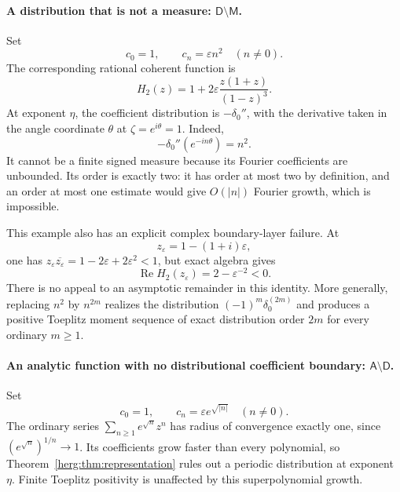 \documentclass[11pt,letterpaper]{article}
\theoremstyle{definition}
\newcommand{\Rea}{\operatorname{Re}}
\newcommand{\eps}{\varepsilon}
\numberwithin{equation}{section}
\begin{document}
\paragraph{A distribution that is not a measure: $\mathsf D\setminus\mathsf M$.}
Set
\begin{equation}\label{herg:eq:n2moments}
 c_0=1,\qquad c_n=\eps n^2\quad(n\ne0).
\end{equation}
The corresponding rational coherent function is
\begin{equation}\label{herg:eq:n2function}
 H_2(z)=1+2\eps\frac{z(1+z)}{(1-z)^3}.
\end{equation}
At exponent $\eta$, the coefficient distribution is $-\delta_0''$, with the derivative taken in the angle coordinate $\theta$ at $\zeta=e^{i\theta}=1$. Indeed,
\[
 -\delta_0''(e^{-in\theta})=n^2.
\]
It cannot be a finite signed measure because its Fourier coefficients are unbounded. Its order is exactly two: it has order at most two by definition, and an order at most one estimate would give $O(|n|)$ Fourier growth, which is impossible.

This example also has an explicit complex boundary-layer failure. At
\[
 z_\eps=1-(1+i)\eps,
\]
one has $z_\eps\overline{z_\eps}=1-2\eps+2\eps^2<1$, but exact algebra gives
\begin{equation}\label{herg:eq:n2boundary}
 \Rea H_2(z_\eps)=2-\eps^{-2}<0.
\end{equation}
There is no appeal to an asymptotic remainder in this identity. More generally, replacing $n^2$ by $n^{2m}$ realizes the distribution $(-1)^m\delta_0^{(2m)}$ and produces a positive Toeplitz moment sequence of exact distribution order $2m$ for every ordinary $m\ge1$.

\paragraph{An analytic function with no distributional coefficient boundary: $\mathsf A\setminus\mathsf D$.}
Set
\begin{equation}\label{herg:eq:superpolynomial}
 c_0=1,\qquad c_n=\eps e^{\sqrt{|n|}}\quad(n\ne0).
\end{equation}
The ordinary series $\sum_{n\ge1}e^{\sqrt n}z^n$ has radius of convergence exactly one, since $(e^{\sqrt n})^{1/n}\to1$. Its coefficients grow faster than every polynomial, so Theorem~\ref{herg:thm:representation} rules out a periodic distribution at exponent $\eta$. Finite Toeplitz positivity is unaffected by this superpolynomial growth.
\end{document}
